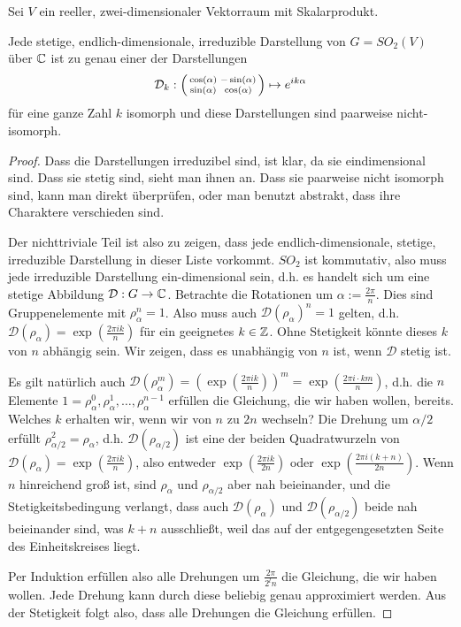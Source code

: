 \begin{theorem}[Darstellungstheorie von $SO_2$ über $\IK=\IC$]
Sei $V$ ein reeller, zwei-dimensionaler Vektorraum mit Skalarprodukt.

Jede stetige, endlich-dimensionale, irreduzible Darstellung von $G=SO_2(V)$ über $\mathbb{C}$ ist zu genau einer der Darstellungen
\[\mathcal{D}_k : \begin{psmallmatrix}\cos(\alpha)&-\sin(\alpha)\\\sin(\alpha)&\cos(\alpha)\end{psmallmatrix} \mapsto e^{ik\alpha}\]
für eine ganze Zahl $k$ isomorph und diese Darstellungen sind paarweise nicht-isomorph.
\end{theorem}
\begin{proof}
Dass die Darstellungen irreduzibel sind, ist klar, da sie eindimensional sind. Dass sie stetig sind, sieht man ihnen an. Dass sie paarweise nicht isomorph sind, kann man direkt überprüfen, oder man benutzt abstrakt, dass ihre Charaktere verschieden sind.

Der nichttriviale Teil ist also zu zeigen, dass jede endlich-dimensionale, stetige, irreduzible Darstellung in dieser Liste vorkommt. $SO_2$ ist kommutativ, also muss jede irreduzible Darstellung ein-dimensional sein, d.h. es handelt sich um eine stetige Abbildung $\mathcal{D}: G\to\mathbb{C}$. Betrachte die Rotationen um $\alpha:=\frac{2\pi}{n}$. Dies sind Gruppenelemente mit $\rho_\alpha^n=1$. Also muss auch $\mathcal{D}(\rho_\alpha)^n=1$ gelten, d.h. $\mathcal{D}(\rho_\alpha) = \exp(\frac{2\pi i k}{n})$ für ein geeignetes $k\in\mathbb{Z}$. Ohne Stetigkeit könnte dieses $k$ von $n$ abhängig sein. Wir zeigen, dass es unabhängig von $n$ ist, wenn $\mathcal{D}$ stetig ist.

Es gilt natürlich auch $\mathcal{D}(\rho_\alpha^m) = (\exp(\frac{2\pi i k}{n}))^m = \exp(\frac{2\pi i\cdot  km}{n})$, d.h. die $n$ Elemente $1=\rho_\alpha^0, \rho_\alpha^1, \ldots, \rho_\alpha^{n-1}$ erfüllen die Gleichung, die wir haben wollen, bereits. Welches $k$ erhalten wir, wenn wir von $n$ zu $2n$ wechseln? Die Drehung um $\alpha/2$ erfüllt $\rho_{\alpha/2}^2=\rho_\alpha$, d.h. $\mathcal{D}(\rho_{\alpha/2})$ ist eine der beiden Quadratwurzeln von $\mathcal{D}(\rho_\alpha)=\exp(\frac{2\pi i k}{n})$, also entweder $\exp(\frac{2\pi i k}{2n})$ oder $\exp(\frac{2\pi i(k+n)}{2n})$. Wenn $n$ hinreichend groß ist, sind $\rho_\alpha$ und $\rho_{\alpha/2}$ aber nah beieinander, und die Stetigkeitsbedingung verlangt, dass auch $\mathcal{D}(\rho_\alpha)$ und $\mathcal{D}(\rho_{\alpha/2})$ beide nah beieinander sind, was $k+n$ ausschließt, weil das auf der entgegengesetzten Seite des Einheitskreises liegt.

Per Induktion erfüllen also alle Drehungen um $\frac{2\pi}{2^l n}$ die Gleichung, die wir haben wollen. Jede Drehung kann durch diese beliebig genau approximiert werden. Aus der Stetigkeit folgt also, dass alle Drehungen die Gleichung erfüllen.
\end{proof}

